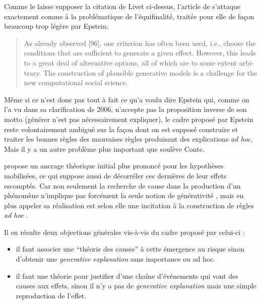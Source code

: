 Comme le laisse supposer la citation de Livet ci-dessus, l'article de \textcites{Conte2007, Conte2012} s'attaque exactement comme \textcite{Yanoff2008} à la problématique de l'équifinalité, traitée pour elle de façon beaucoup trop légère par Epstein.

\foreignblockquote{english}[{\cite[340]{Conte2012}}]{As already observed [96], one criterion has often been used, i.e., choose the conditions that are sufficient to generate a given effect. However, this leads to a great deal of alternative options, all of which are to some extent arbitrary. The construction of plausible generative models is a challenge for the new computational social science.}

Même si ce n'est donc pas tout à fait ce qu'a voulu dire Epstein qui, comme on l'a vu dans sa clarification de 2006, n'accepte pas la proposition inverse de son motto (générer n'est pas nécessairement expliquer), le cadre proposé par Epstein reste volontairement ambiguë sur la façon dont on est supposé construire et traiter les bonnes règles des mauvaises règles produisant des explications \textit{ad hoc}. Mais il y a un autre problème plus important que soulève Conte.

\textcite{Conte2007} propose un ancrage théorique initial plus prononcé pour les hypothèses mobilisées, ce qui suppose aussi de décorréler ces dernières de leur effets escomptés. Car non seulement la recherche de cause dans la production d'un phénomène n'implique pas forcément la seule notion de générativité , mais en plus appeler sa réalisation est selon elle une incitation à la construction de règles \textit{ad hoc} .

Il en résulte deux objections générales vis-à-vis du cadre proposé par celui-ci :
\begin{itemize}
\item il faut associer une \enquote{théorie des causes} à cette émergence au risque sinon d'obtenir une \textit{generative explanation} sans importance ou ad hoc.
\item il faut une théorie pour justifier d'une chaîne d'événements qui vont des causes aux effets, sinon il n'y a pas de \textit{generative explanation} mais une simple reproduction de l'effet.
\end{itemize}


